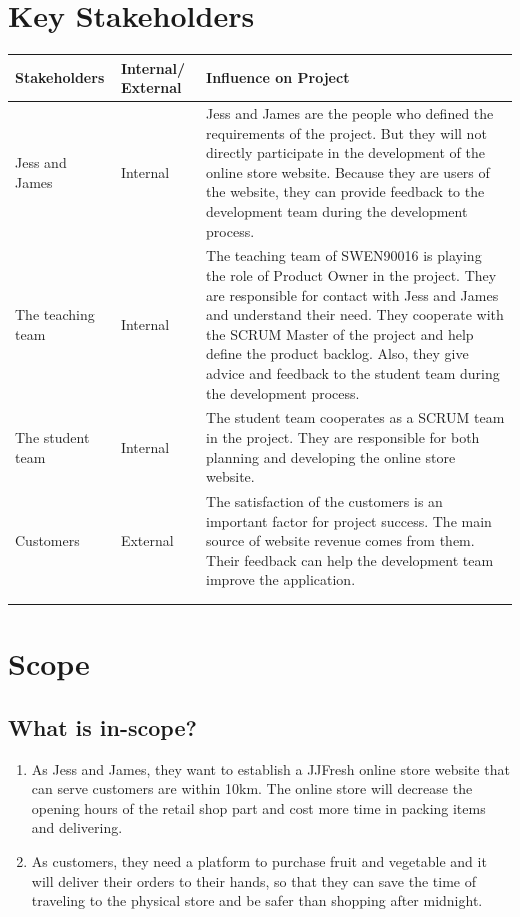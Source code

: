 \documentclass{report}
\begin{document}
\section{Key Stakeholders}
\begin{tabularx}{0.95\linewidth}{%
  >{\raggedright\arraybackslash}l%
  >{\raggedright\arraybackslash}p{1.5cm}%
  >{\raggedright\arraybackslash}X}
  \toprule
  Stakeholders & Internal/ External & Influence on Project \\
  \midrule
  Jess and James
  & Internal
  & Jess and James are the people who defined the requirements of the project. But they will not directly participate in the development of the online store website. Because they are users of the website, they can provide feedback to the development team during the development process.
  \\
  \midrule
  The teaching team
  & Internal
  & The teaching team of SWEN90016 is playing the role of Product Owner in the project. They are responsible for contact with Jess and James and understand their need.  They cooperate with the SCRUM Master of the project and help define the product backlog. Also, they give advice and feedback to the student team during the development process.
  \\
  \midrule
  The student team
  & Internal
  & The student team cooperates as a SCRUM team in the project. They are responsible for both planning and developing the online store website. 
  \\
  \midrule
  Customers
  & External
  & The satisfaction of the customers is an important factor for project success. The main source of website revenue comes from them. Their feedback can help the development team improve the application.
  \\
  \bottomrule
  \\
  \caption{Stakeholder Register}  
  \label{tab:stakeholderRegister}
\end{tabularx}

\section{Scope}
\subsection{What is in-scope?}
\begin{enumerate}
  \item As Jess and James, they want to establish a JJFresh online store website that can serve customers are within 10km. The online store will decrease the opening hours of the retail shop part and cost more time in packing items and delivering.
  \item As customers, they need a platform to purchase fruit and vegetable and it will deliver their orders to their hands, so that they can save the time of traveling to the physical store and be safer than shopping after midnight.
\end{enumerate}
\end{document}
